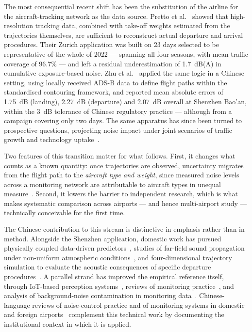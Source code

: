 \documentclass[review,12pt]{elsarticle}
\begin{document}
The most consequential recent shift has been the substitution of the airline
for the aircraft-tracking network as the data source. Pretto et
al.~\cite{pretto2024aircraft} showed that high-resolution tracking data,
combined with take-off weights estimated from the trajectories themselves, are
sufficient to reconstruct actual departure and arrival procedures. Their Zurich
application was built on 23 days selected to be representative of the whole of
2022 --- spanning all four seasons, with mean traffic coverage of 96.7\% --- and
left a residual underestimation of 1.7~dB(A) in cumulative exposure-based
noise. Zhu et al.~\cite{zhu2025dynamic} applied the same logic in a Chinese
setting, using locally received ADS-B data to define flight paths within the
standardised contouring framework, and reported mean absolute errors of
1.75~dB (landing), 2.27~dB (departure) and 2.07~dB overall at Shenzhen Bao'an,
within the 3~dB tolerance of Chinese regulatory practice --- although from a
campaign covering only two days. The same apparatus has since been turned to
prospective questions, projecting noise impact under joint scenarios of traffic
growth and technology uptake~\citep{einicke2025predicting}.

Two features of this transition matter for what follows. First, it changes what
counts as a known quantity: once trajectories are observed, uncertainty
migrates from the flight path to the \emph{aircraft type and weight}, since
measured noise levels across a monitoring network are attributable to aircraft
types in unequal measure~\citep{simons2026contribution}. Second, it lowers the
barrier to independent research, which is what makes systematic comparison
across airports --- and hence multi-airport study --- technically conceivable
for the first time.

The Chinese contribution to this stream is distinctive in emphasis rather than
in method. Alongside the Shenzhen application, domestic work has pursued
physically coupled data-driven predictors~\citep{feng2024physics}, studies of
far-field sound propagation under non-uniform atmospheric
conditions~\citep{hong2023nonuniform}, and four-dimensional trajectory simulation
to evaluate the acoustic consequences of specific departure
procedures~\citep{zhuang2025four}. A parallel strand has improved the
empirical reference itself, through IoT-based perception
systems~\citep{liu2025iot}, reviews of monitoring practice~\citep{zhao2022review},
and analysis of background-noise contamination in monitoring
data~\citep{qu2024background}. Chinese-language reviews of noise-control practice
and of monitoring systems in domestic and foreign
airports~\citep{yang2023status, wang2024noise} complement this technical work by
documenting the institutional context in which it is applied.
\end{document}
